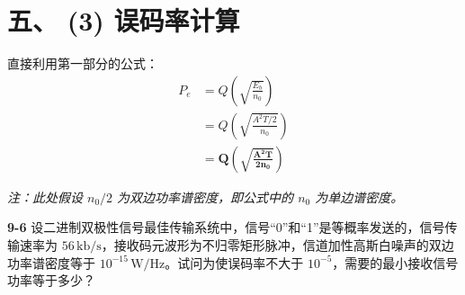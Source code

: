 \documentclass[a4paper,11pt]{ctexart}
\begin{document}
    \hrulefill

    \section*{五、 (3) 误码率计算}
    
    直接利用第一部分的公式：
    \begin{align*}
        P_e &= Q\left( \sqrt{\frac{E_b}{n_0}} \right) \\
            &= Q\left( \sqrt{\frac{A^2 T / 2}{n_0}} \right) \\
            &= \mathbf{Q\left( \sqrt{\frac{A^2 T}{2 n_0}} \right)}
    \end{align*}
    
    \textit{注：此处假设 $n_0/2$ 为双边功率谱密度，即公式中的 $n_0$ 为单边谱密度。}



\vspace{3em} %

\noindent \textbf{9-6} 设二进制双极性信号最佳传输系统中，信号“0”和“1”是等概率发送的，信号传输速率为 $56\,\text{kb/s}$，接收码元波形为不归零矩形脉冲，信道加性高斯白噪声的双边功率谱密度等于 $10^{-15}\,\text{W}/\text{Hz}$。试问为使误码率不大于 $10^{-5}$，需要的最小接收信号功率等于多少？
\end{document}

